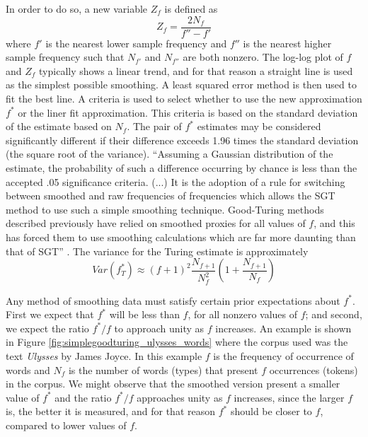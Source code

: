 In order to do so, a new variable $Z_f$ is defined as 
\begin{equation}
Z_f = \frac{2 N_f}{f'' - f'}
\end{equation}
where $f'$ is the nearest lower sample frequency and $f''$ is the nearest higher sample frequency
such that $N_{f'}$ and $N_{f''}$ are both nonzero.
The log-log plot of $f$ and $Z_f$ typically shows a linear trend, and for that reason a straight line
is used as the simplest possible smoothing. A least squared error method is then used to fit the best
line. A criteria is used to select whether to use the new approximation $f^\ast$ or the liner fit
approximation. This criteria is based on the standard deviation of the estimate based on $N_f$.
The pair of $f^\ast$ estimates may be considered significantly different if their difference exceeds
1.96 times the standard deviation (the square root of the variance). 
``Assuming a Gaussian distribution of the estimate, the probability of
such a difference occurring by chance is less than the accepted .05 significance criteria. (...)
It is the adoption of a rule for switching between smoothed and raw frequencies of frequencies which
allows the SGT method to use such a simple smoothing technique. Good-Turing methods described previously
have relied on smoothed proxies for all values of $f$, and this has forced them to use smoothing calculations
which are far more daunting than that of SGT'' \citep{galesampson95}.
The variance for the Turing estimate is approximately
\begin{equation}
Var(f^\ast_T) \approx (f+1)^2 \frac{N_{f+1}}{N_f^2} \left( 1 + \frac{N_{f+1}}{N_f} \right)
\end{equation}



Any method of smoothing data must satisfy certain prior expectations about $f^\ast$. First we expect that
$f^\ast$ will be less than $f$, for all nonzero values of $f$; and second, we expect the ratio $f^\ast/f$
to approach unity as $f$ increases. An example is shown in Figure \ref{fig:simplegoodturing_ulysses_words} where the corpus used was the 
text \textit{Ulysses} by James Joyce. In this example $f$ is the frequency of occurrence of words
and $N_f$ is the number of words (types) that present $f$ occurrences (tokens) in the corpus.
We might observe that the smoothed version present a smaller value of $f^\ast$ and the ratio
$f^\ast/f$ approaches unity as $f$ increases, since the larger $f$ is, the better it is measured,
and for that reason $f^\ast$ should be closer to $f$, compared to lower values of $f$.


